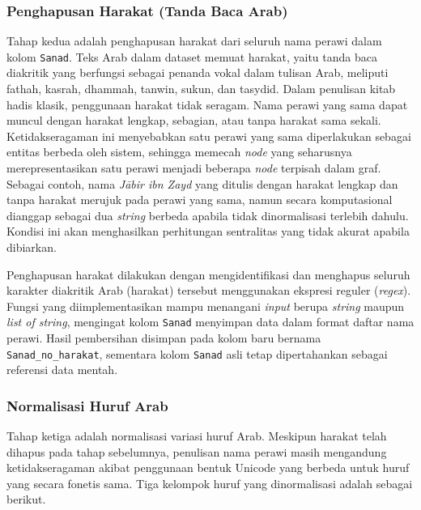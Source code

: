 \subsubsection{Penghapusan Harakat (Tanda Baca Arab)}
\begin{sloppypar}
Tahap kedua adalah penghapusan harakat dari seluruh nama perawi dalam kolom \texttt{Sanad}. Teks Arab dalam dataset memuat harakat, yaitu tanda baca diakritik yang berfungsi sebagai penanda vokal dalam tulisan Arab, meliputi fathah, kasrah, dhammah, tanwin, sukun, dan tasydid. Dalam penulisan kitab hadis klasik, penggunaan harakat tidak seragam. Nama perawi yang sama dapat muncul dengan harakat lengkap, sebagian, atau tanpa harakat sama sekali. Ketidakseragaman ini menyebabkan satu perawi yang sama diperlakukan sebagai entitas berbeda oleh sistem, sehingga memecah \textit{node} yang seharusnya merepresentasikan satu perawi menjadi beberapa \textit{node} terpisah dalam graf. Sebagai contoh, nama \textit{J\={a}bir ibn Zayd} yang ditulis dengan harakat lengkap dan tanpa harakat merujuk pada perawi yang sama, namun secara komputasional dianggap sebagai dua \textit{string} berbeda apabila tidak dinormalisasi terlebih dahulu. Kondisi ini akan menghasilkan perhitungan sentralitas yang tidak akurat apabila dibiarkan.

Penghapusan harakat dilakukan dengan mengidentifikasi dan menghapus seluruh karakter diakritik Arab (harakat) tersebut menggunakan ekspresi reguler (\textit{regex}). Fungsi yang diimplementasikan mampu menangani \textit{input} berupa \textit{string} maupun \textit{list of string}, mengingat kolom \texttt{Sanad} menyimpan data dalam format daftar nama perawi. Hasil pembersihan disimpan pada kolom baru bernama \texttt{Sanad\_no\_harakat}, sementara kolom \texttt{Sanad} asli tetap dipertahankan sebagai referensi data mentah.
\end{sloppypar}

\subsubsection{Normalisasi Huruf Arab}
Tahap ketiga adalah normalisasi variasi huruf Arab. Meskipun harakat telah dihapus pada tahap sebelumnya, penulisan nama perawi masih mengandung ketidakseragaman akibat penggunaan bentuk Unicode yang berbeda untuk huruf yang secara fonetis sama. Tiga kelompok huruf yang dinormalisasi adalah sebagai berikut.

